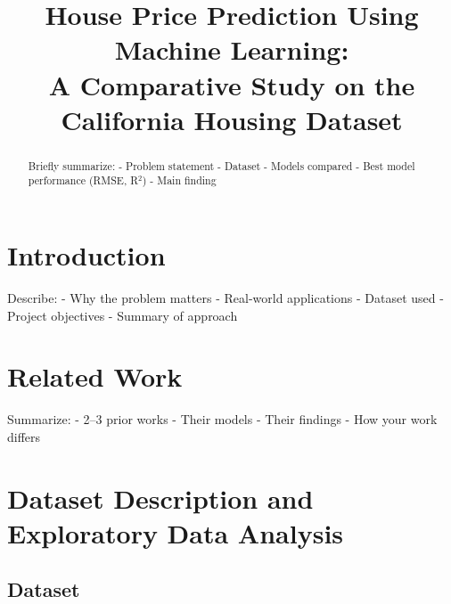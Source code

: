 \documentclass[conference]{IEEEtran}
\begin{document}
\title{House Price Prediction Using Machine Learning:\\
A Comparative Study on the California Housing Dataset}

\author{
}

\maketitle

\begin{abstract}
Briefly summarize:
- Problem statement
- Dataset
- Models compared
- Best model performance (RMSE, R$^2$)
- Main finding
\end{abstract}

\section{Introduction}
\label{sec:intro}

Describe:
- Why the problem matters
- Real-world applications
- Dataset used
- Project objectives
- Summary of approach

\section{Related Work}
\label{sec:related}

Summarize:
- 2–3 prior works
- Their models
- Their findings
- How your work differs

\section{Dataset Description and Exploratory Data Analysis}
\label{sec:data}

\subsection{Dataset}
\end{document}
